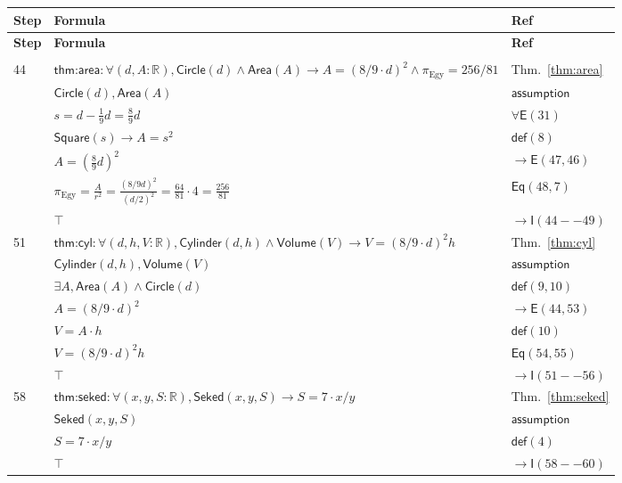 \documentclass[12pt]{amsart}
\newcommand{\br}{,\allowbreak}
\newcommand{\R}{\mathbb{R}}
\newenvironment{prooftable}{%
	\renewcommand{\arraystretch}{1.2}%
	\setlength{\tabcolsep}{4pt}%
	\setlength{\arrayrulewidth}{0.05pt}
	\tiny
	\sloppy
	\begin{longtable}{
			|>{\centering\arraybackslash}m{0.7cm}|
			>{\raggedright\centering\arraybackslash}m{0.70\textwidth}|
			>{\centering\arraybackslash}m{3.5cm}|  %
		}%
		\hline
		\textbf{Step} & \centering\textbf{Formula} & \textbf{Ref} \\
		\hline
		\endfirsthead
		\hline
		\textbf{Step} & \centering\textbf{Formula} & \textbf{Ref} \\
		\hline
		\endhead
		\hline
		\multicolumn{3}{r}{\textit{Continued on next page}} \\
		\endfoot
		\hline
		\endlastfoot
	}{%
	\end{longtable}%
}
\newcommand{\thicksoliddoubleline}{%
	\noalign{\vskip1pt}%
	\noalign{\hrule height 0.2pt}%
	\noalign{\vskip0.2pt}%
	\noalign{\hrule height 0.2pt}%
	\noalign{\vskip1pt}%
}
\begin{document}
\begin{prooftable}
	\thicksoliddoubleline
	44 & $\textsf{thm:area}: \forall(d \br A:\R) \br  \textsf{Circle}(d)\land \textsf{Area}(A) \to A = (8/9\cdot d)^2 \land \pi_{\text{Egy}}=256/81$ & Thm.~\ref{thm:area} \\
	\hdashline
	45 & $\textsf{Circle}(d) \br \textsf{Area}(A)$ & $\mathsf{assumption}$ \\
	\hdashline
	46 & $s = d - \frac{1}{9}d = \frac{8}{9}d$ & $\forall \mathsf{E}(31)$ \\
	\hdashline
	47 & $\textsf{Square}(s) \to A = s^2$ & $\mathsf{def}(8)$ \\
	\hdashline
	48 & $A = \left(\frac{8}{9}d\right)^2$ & $\to \mathsf{E}(47 \br 46)$ \\
	\hdashline
	49 & $\pi_{\text{Egy}} = \frac{A}{r^2} = \frac{(8/9d)^2}{(d/2)^2} = \frac{64}{81}\cdot 4 = \frac{256}{81}$ & $\mathsf{Eq}(48 \br 7)$ \\
	\hdashline
	50 & $\top$ & $\to \mathsf{I}(44--49)$ \\
	
	\thicksoliddoubleline
	51 & $\textsf{thm:cyl}: \forall(d \br h \br V:\R) \br  \textsf{Cylinder}(d \br h)\land \textsf{Volume}(V) \to V = (8/9\cdot d)^2 h$ & Thm.~\ref{thm:cyl} \\
	\hdashline
	52 & $\textsf{Cylinder}(d \br h) \br \textsf{Volume}(V)$ & $\mathsf{assumption}$ \\
	\hdashline
	53 & $\exists A \br  \textsf{Area}(A) \land \textsf{Circle}(d)$ & $\mathsf{def}(9 \br 10)$ \\
	\hdashline
	54 & $A = (8/9\cdot d)^2$ & $\to \mathsf{E}(44 \br 53)$ \\
	\hdashline
	55 & $V = A \cdot h$ & $\mathsf{def}(10)$ \\
	\hdashline
	56 & $V = (8/9\cdot d)^2 h$ & $\mathsf{Eq}(54 \br 55)$ \\
	\hdashline
	57 & $\top$ & $\to \mathsf{I}(51--56)$ \\
	
	\thicksoliddoubleline
	58 & $\textsf{thm:seked}: \forall(x \br y \br S:\R) \br  \textsf{Seked}(x \br y \br S) \to S = 7\cdot x/y$ & Thm.~\ref{thm:seked} \\
	\hdashline
	59 & $\textsf{Seked}(x \br y \br S)$ & $\mathsf{assumption}$ \\
	\hdashline
	60 & $S = 7 \cdot x/y$ & $\mathsf{def}(4)$ \\
	\hdashline
	61 & $\top$ & $\to \mathsf{I}(58--60)$ \\
	

\end{prooftable}
\end{document}
